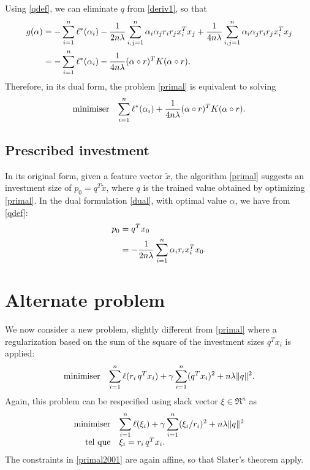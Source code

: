 Using \eqref{qdef}, we can eliminate $q$ from \eqref{deriv1}, so that
\begin{align}
  g(\alpha) &= -\sum_{i=1}^n \ell^*(\alpha_i) - \frac{1}{2n\lambda}\sum_{i,j=1}^n \alpha_i\alpha_jr_ir_jx_i^Tx_j + \frac{1}{4n\lambda}
         \sum_{i,j=1}^n \alpha_i\alpha_jr_ir_jx_i^Tx_j\\
       &= -\sum_{i=1}^n \ell^*(\alpha_i) - \frac{1}{4n\lambda}(\alpha \circ r)^TK(\alpha \circ r). 
\end{align}
Therefore, in its dual form, the problem \eqref{primal} is equivalent to solving
\begin{equation}
  \label{dual}
  \begin{array}{ll}\mbox{minimiser} & \displaystyle{\sum_{i=1}^n\ell^*(\alpha_i) + \frac{1}{4n\lambda}(\alpha \circ r)^TK(\alpha \circ r).}\end{array}
\end{equation}

\subsection{Prescribed investment}

In its original form, given a feature vector $\tilde x$, the algorithm \eqref{primal}
suggests an investment size of $p_0=q^T\tilde x$, where $q$ is the trained value obtained by
optimizing \eqref{primal}. In the dual formulation \eqref{dual}, with optimal value
$\alpha$, we have from \eqref{qdef}:
\begin{align}
  p_0 &= q^Tx_0\\
      &= - \frac{1}{2n\lambda}\sum_{i=1}^n \alpha_ir_ix_i^Tx_0.
\end{align}


\section{Alternate problem}

We now consider a new problem, slightly different from \eqref{primal} where a
regularization based on the sum of the square of the investment sizes $q^Tx_i$ is applied:
\begin{equation}
  \label{primal2000}
  \begin{array}{ll}\mbox{minimiser} & \displaystyle{\sum_{i=1}^n\ell(r_i\,q^Tx_i) + \gamma\sum_{i=1}^n(q^Tx_i)^2 + n\lambda\|q\|^2.}\end{array}
\end{equation}
Again, this problem can be respecified using slack vector $\xi \in \Re^n$ as
\begin{align}
  \minimizeEquationSt{\label{primal2001}\sumi \ell(\xi_i) + \gamma\sumi(\xi_i/r_i)^2 + n\lambda\|q\|^2}[\xi_i = r_i\,q^Tx_i.]
\end{align}
The constraints in \eqref{primal2001} are again affine, so that Slater's theorem apply.

